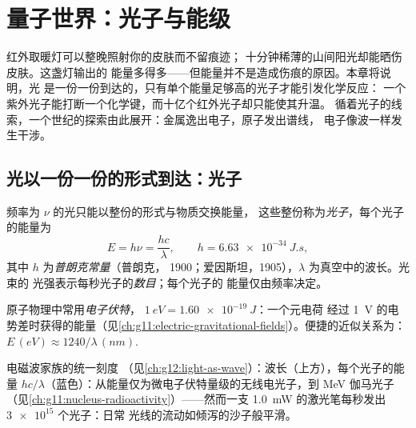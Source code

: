 \chapter{量子世界：光子与能级}\label{ch:g12:quantum-world}

红外取暖灯可以整晚照射你的皮肤而不留痕迹；
十分钟稀薄的山间阳光却能晒伤皮肤。这盏灯输出的
能量多得多——但能量并不是造成伤痕的原因。本章将说明，光
是一份一份到达的，只有单个能量足够高的光子才能引发化学反应：
一个紫外光子能打断一个化学键，而十亿个红外光子却只能使其升温。
循着光子的线索，一个世纪的探索由此展开：金属逸出电子，原子发出谱线，
电子像波一样发生干涉。

\section{光以一份一份的形式到达：光子}

\begin{definition}[光子]\label{def:g12:quantum-world:photon}
频率为 $\nu$ 的光只能以整份的形式与物质交换能量，
这些整份称为\emph{光子}，每个光子的能量为
\[
E = h\nu = \frac{hc}{\lambda}, \qquad h = \qty{6.63e-34}{J.s},
\]
其中 $h$ 为\emph{普朗克常量}（普朗克，
1900；爱因斯坦，1905），$\lambda$ 为真空中的波长。光束的
光强表示每秒光子的\emph{数目}；每个光子的
能量仅由频率决定。
\end{definition}

\begin{notation}[电子伏特]\label{not:g12:quantum-world:ev}
原子物理中常用\emph{电子伏特}，
$\qty{1}{eV} = \qty{1.60e-19}{J}$：一个元电荷
经过 \qty{1}{V} 的电势差时获得的能量（见\cref{ch:g11:electric-gravitational-fields}）。便捷的近似关系为：
$E \,(\unit{eV}) \approx 1240/\lambda\,(\unit{nm})$.
\end{notation}

\begin{omfigure}

{\small 电磁波家族的统一刻度
（见\cref{ch:g12:light-as-wave}）：波长（上方），每个光子的能量
$hc/\lambda$（蓝色）：从能量仅为微电子伏特量级的无线电光子，到
\unit{MeV} 伽马光子（见\cref{ch:g11:nucleus-radioactivity}）——然而一支
\qty{1.0}{mW} 的激光笔每秒发出 $\num{3e15}$ 个光子：日常
光线的流动如倾泻的沙子般平滑。}
\end{omfigure}

